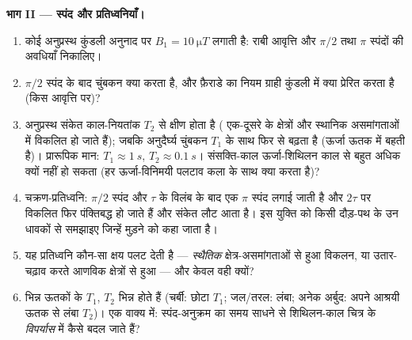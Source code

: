 \begin{problem}
\medskip\noindent\textbf{भाग II --- स्पंद और प्रतिध्वनियाँ।}
\begin{enumerate}[resume]
  \item कोई अनुप्रस्थ कुंडली अनुनाद पर $B_1 = \qty{10}{\micro T}$
        लगाती है: राबी आवृत्ति और
        $\pi/2$ तथा $\pi$ स्पंदों की अवधियाँ निकालिए।
  \item $\pi/2$ स्पंद के बाद चुंबकन क्या करता है, और फ़ैराडे का नियम
        ग्राही कुंडली में क्या प्रेरित करता है (किस
        आवृत्ति पर)?
  \item अनुप्रस्थ संकेत काल-नियतांक $T_2$ से क्षीण होता है
        ( एक-दूसरे के क्षेत्रों और स्थानिक
        असमांगताओं में विकलित हो जाते हैं); जबकि अनुदैर्घ्य चुंबकन
        $T_1$ के साथ फिर से बढ़ता है (ऊर्जा ऊतक में बहती है)।
        प्रारूपिक मान: $T_1 \approx \qty{1}{s}$, $T_2 \approx \qty{0.1}{s}$।
        संसक्ति-काल ऊर्जा-शिथिलन काल से बहुत अधिक क्यों नहीं हो
        सकता (हर ऊर्जा-विनिमयी पलटाव कला के साथ क्या करता है)?
  \item चक्रण-प्रतिध्वनि: $\pi/2$ स्पंद और $\tau$ के विलंब के बाद
        एक $\pi$ स्पंद लगाई जाती है और $2\tau$ पर विकलित
         फिर पंक्तिबद्ध हो जाते हैं और संकेत लौट आता है। इस
        युक्ति को किसी दौड़-पथ के उन धावकों से समझाइए जिन्हें मुड़ने
        को कहा जाता है।
  \item यह प्रतिध्वनि कौन-सा क्षय पलट देती है --- \emph{स्थैतिक}
        क्षेत्र-असमांगताओं से हुआ विकलन, या उतार-चढ़ाव करते आणविक
        क्षेत्रों से हुआ --- और केवल वही क्यों?
  \item भिन्न ऊतकों के $T_1$, $T_2$ भिन्न होते हैं (चर्बी:
        छोटा $T_1$; जल/तरल: लंबा; अनेक अर्बुद: अपने आश्रयी ऊतक से
        लंबा $T_2$)। एक वाक्य में: स्पंद-अनुक्रम का समय साधने से
        शिथिलन-काल चित्र के \emph{विपर्यास} में कैसे बदल जाते हैं?
\end{enumerate}


\end{problem}
